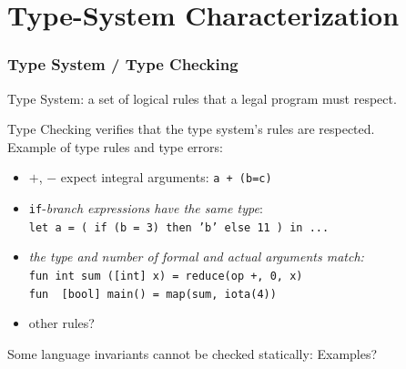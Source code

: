 \documentclass{beamer}
\renewcommand{\emph}[1]{\textcolor{structure}{#1}}
\newcommand{\emp}[1]{\textcolor{DikuRed}{ #1}}
\begin{document}
\section{Type-System Characterization}

\begin{frame}[fragile]
	\tableofcontents[currentsection]
\end{frame}


\begin{frame}[fragile,t]
   \frametitle{Type System / Type Checking}

\emph{Type System:} a set of logical rules that a legal program must respect.

\bigskip

\emph{Type Checking} verifies that the type system's rules are respected.\\
Example of type rules and type \alert{errors}:
 
\smallskip

\begin{itemize}
\item $+$, $-$ expect integral arguments: {\tt a \alert{+ (b=c)}} \smallskip

\item {\tt if}-{\em{}branch expressions have the same type}:\\
{\tt let a = ( if (b = 3) then \alert{'b'} else \alert{11} ) in ...}\smallskip

\item {\em the type and number of formal and actual arguments match:}\\
{\tt fun int sum (\alert{[int]} x) = reduce(op +, 0, x)}\\
{\tt fun \emp{[bool]} main() = map(sum, \alert{iota(4)})}\smallskip

\item \emp{other rules?}\smallskip
\end{itemize}

\bigskip

Some language invariants cannot be checked statically: \emp{Examples?}

\end{frame}
\end{document}
